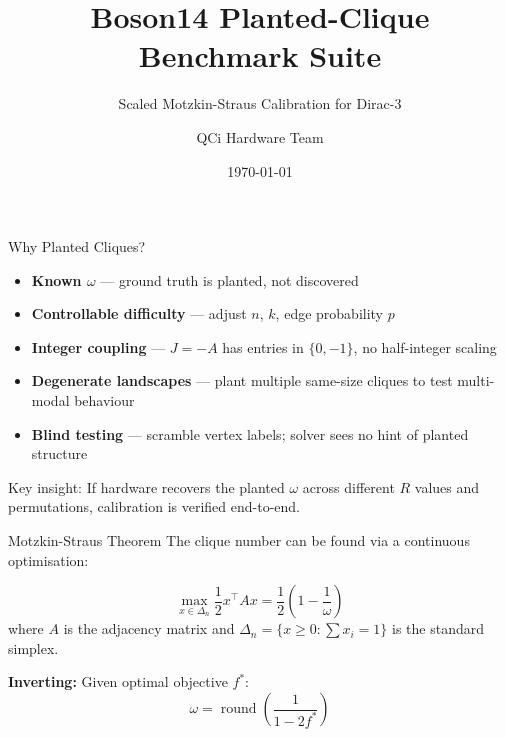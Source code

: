 \documentclass[aspectratio=169]{beamer}
\title{Boson14 Planted-Clique Benchmark Suite}
\subtitle{Scaled Motzkin-Straus Calibration for Dirac-3}
\author{QCi Hardware Team}
\date{\today}
\institute{Quantum Computing Inc.}
\begin{document}

\maketitle


\begin{frame}{Why Planted Cliques?}
    \begin{itemize}
        \item \textbf{Known $\omega$} — ground truth is planted, not discovered
        \item \textbf{Controllable difficulty} — adjust $n$, $k$, edge probability $p$
        \item \textbf{Integer coupling} — $J = -A$ has entries in $\{0, -1\}$, no half-integer scaling
        \item \textbf{Degenerate landscapes} — plant multiple same-size cliques to test multi-modal behaviour
        \item \textbf{Blind testing} — scramble vertex labels; solver sees no hint of planted structure
    \end{itemize}

    \vspace{1em}
    \alert{Key insight:} If hardware recovers the planted $\omega$ across different $R$ values and permutations, calibration is verified end-to-end.
\end{frame}


\begin{frame}{Motzkin-Straus Theorem}
    The clique number can be found via a continuous optimisation:

    \begin{theorem}
        \[
            \max_{x \in \Delta_n} \frac{1}{2} x^\top A x = \frac{1}{2}\left(1 - \frac{1}{\omega}\right)
        \]
        where $A$ is the adjacency matrix and $\Delta_n = \{x \geq 0 : \sum x_i = 1\}$ is the standard simplex.
    \end{theorem}

    \vspace{0.5em}
    \textbf{Inverting:} Given optimal objective $f^*$:
    \[
        \omega = \operatorname{round}\!\left(\frac{1}{1 - 2f^*}\right)
    \]
\end{frame}
\end{document}
